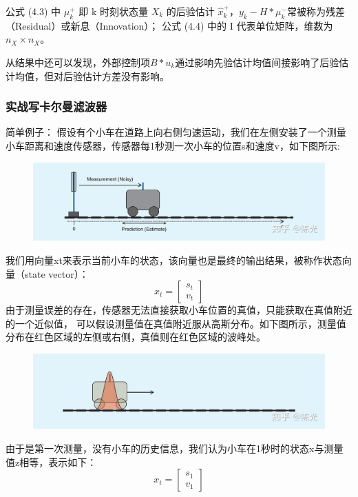 \documentclass[12pt]{ctexart}
\begin{document}
公式 (4.3) 中 $\mu_k^+$ 即 k 时刻状态量 $X_k$ 的后验估计 $\hat{x}_k^+，y_k-H*\mu_k^- $常被称为残差（Residual）或新息（Innovation）；
公式 (4.4) 中的 I 代表单位矩阵，维数为 $n_X \times n_X$。
        
从结果中还可以发现，外部控制项$ B*u_k $通过影响先验估计均值间接影响了后验估计均值，但对后验估计方差没有影响。


\subsubsection{实战写卡尔曼滤波器}
\textcolor{myblue}{简单例子：}
假设有个小车在道路上向右侧匀速运动，我们在左侧安装了一个测量小车距离和速度传感器，传感器每1秒测一次小车的位置s和速度v，如下图所示:
\begin{figure}[h]
    \centering
    \includegraphics[width = 12cm]{image/11.jpg}
\end{figure}
我们用向量xt来表示当前小车的状态，该向量也是最终的输出结果，被称作状态向量（state vector）：
\[
    x_t=
    \left[ 
        \begin{matrix}
            s_t \\
            v_t 
        \end{matrix}
    \right] \tag{1}
\]
由于测量误差的存在，传感器无法直接获取小车位置的真值，只能获取在真值附近的一个近似值，
可以假设测量值在真值附近服从高斯分布。如下图所示，测量值分布在红色区域的左侧或右侧，真值则在红色区域的波峰处。
\begin{figure}[h]
    \centering
    \includegraphics[width = 12cm]{image/12.jpg}
\end{figure}
由于是第一次测量，没有小车的历史信息，我们认为小车在1秒时的状态x与测量值z相等，表示如下：
\[
    x_t= 
    \left[
        \begin{matrix}
            s_1 \\
            v_1 
        \end{matrix}
    \right] \tag{2}
\]
\end{document}
